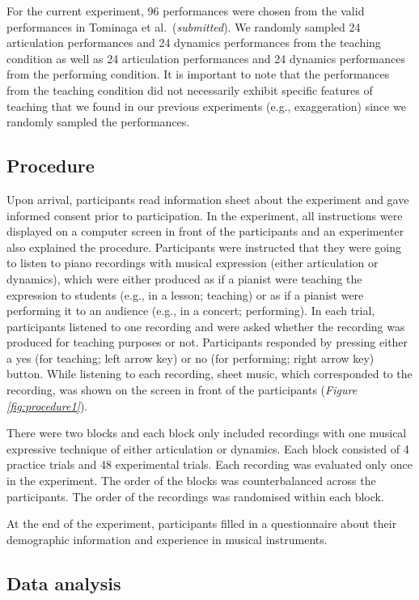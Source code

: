 \documentclass[
  man,floatsintext]{apa6}
\begin{document}
For the current experiment, 96 performances were chosen from the valid performances in Tominaga et al.~(\emph{submitted}). We randomly sampled 24 articulation performances and 24 dynamics performances from the teaching condition as well as 24 articulation performances and 24 dynamics performances from the performing condition. It is important to note that the performances from the teaching condition did not necessarily exhibit specific features of teaching that we found in our previous experiments (e.g., exaggeration) since we randomly sampled the performances.

\hypertarget{procedure}{%
\subsection{Procedure}\label{procedure}}

Upon arrival, participants read information sheet about the experiment and gave informed consent prior to participation. In the experiment, all instructions were displayed on a computer screen in front of the participants and an experimenter also explained the procedure. Participants were instructed that they were going to listen to piano recordings with musical expression (either articulation or dynamics), which were either produced as if a pianist were teaching the expression to students (e.g., in a lesson; teaching) or as if a pianist were performing it to an audience (e.g., in a concert; performing). In each trial, participants listened to one recording and were asked whether the recording was produced for teaching purposes or not. Participants responded by pressing either a yes (for teaching; left arrow key) or no (for performing; right arrow key) button. While listening to each recording, sheet music, which corresponded to the recording, was shown on the screen in front of the participants (\emph{Figure \ref{fig:procedure1}}).

There were two blocks and each block only included recordings with one musical expressive technique of either articulation or dynamics. Each block consisted of 4 practice trials and 48 experimental trials. Each recording was evaluated only once in the experiment. The order of the blocks was counterbalanced across the participants. The order of the recordings was randomised within each block.

At the end of the experiment, participants filled in a questionnaire about their demographic information and experience in musical instruments.

\hypertarget{dataanalysis}{%
\subsection{Data analysis}\label{dataanalysis}}
\end{document}
